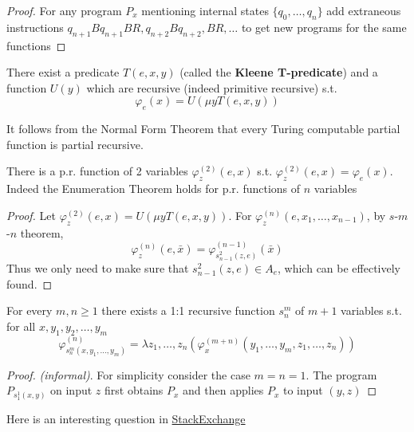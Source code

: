 \documentclass[11pt]{article}
\begin{document}
\begin{proof}
For any program \(P_x\) mentioning internal states \(\{q_0,\dots,q_n\}\) add
extraneous instructions \(q_{n+1}Bq_{n+1}BR,q_{n+2}Bq_{n+2},BR,\dots\) to get
new programs for the same functions
\end{proof}
\begin{theorem}
There exist a predicate \(T(e,x,y)\) (called the \textbf{Kleene T-predicate}) and a
function \(U(y)\) which are recursive (indeed primitive recursive) s.t.
\begin{equation*}
\varphi_e(x)=U(\mu y T(e,x,y))
\end{equation*}
\end{theorem}

It follows from the Normal Form Theorem that every Turing computable partial
function is partial recursive.

\begin{theorem}
There is a p.r. function of 2 variables \(\varphi_z^{(2)}(e,x)\) s.t.
\(\varphi_z^{(2)}(e,x)=\varphi_e(x)\). Indeed the Enumeration Theorem holds for
p.r. functions of \(n\) variables
\end{theorem}
\begin{proof}
Let \(\varphi_z^{(2)}(e,x)=U(\mu y T(e,x,y))\). For
\(\varphi_z^{(n)}(e,x_1,\dots,x_{n-1})\), by \(s\)-\(m\)-\(n\) theorem, 
\begin{equation*}
\varphi_z^{(n)}(e,\bar{x})=
\varphi_{s^2_{n-1}(z,e)}^{(n-1)}(\bar{x})
\end{equation*}
Thus we only need to make sure that \(s^2_{n-1}(z,e)\in A_e\), which can be
effectively found.
\end{proof}
\begin{theorem}
For every \(m,n\ge 1\) there exists a 1:1 recursive function \(s^m_n\) of \(m+1\)
variables s.t. for all \(x,y_1,y_2,\dots,y_m\)
\begin{equation*}
\varphi_{s^m_n(x,y_1,\dots,y_m)}^{(n)}=\lambda z_1,\dots,z_n
(\varphi_x^{(m+n)}(y_1,\dots,y_m,z_1,\dots,z_n))
\end{equation*}
\end{theorem}
\begin{proof}
\emph{(informal)}. For simplicity consider the case \(m=n=1\). The program
\(P_{s_1^1(x,y)}\) on input \(z\) first obtains \(P_x\) and then applies \(P_x\) to
input \((y,z)\)
\end{proof}

\begin{remark}
Here is an interesting question in \href{https://cs.stackexchange.com/questions/80837/is-smn-theorem-the-same-concept-as-currying}{StackExchange}
\end{remark}
\end{document}

